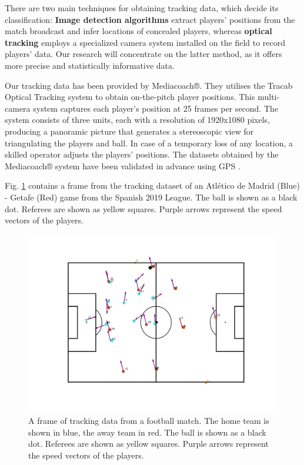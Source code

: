 \documentclass[
  twoside,nohyper]{book}
\begin{document}
There are two main techniques for obtaining tracking data, which decide its classification: \textbf{Image detection algorithms} extract players' positions from the match broadcast and infer locations of concealed players, whereas \textbf{optical tracking} employs a specialized camera system installed on the field to record players' data. Our research will concentrate on the latter method, as it offers more precise and statistically informative data.

Our tracking data has been provided by Mediacoach®. They utilises the Tracab Optical Tracking system to obtain on-the-pitch player positions. This multi-camera system captures each player's position at 25 frames per second. The system consists of three units, each with a resolution of 1920x1080 pixels, producing a panoramic picture that generates a stereoscopic view for triangulating the players and ball. In case of a temporary loss of any location, a skilled operator adjusts the players' positions. The datasets obtained by the Mediacoach® system have been validated in advance using GPS \citep{Felipe2019ValidationOA}.

Fig. \ref{fig:frame} contains a frame from the tracking dataset of an Atlético de Madrid (Blue) - Getafe (Red) game from the Spanish 2019 League. The ball is shown as a black dot. Referees are shown as yellow squares. Purple arrows represent the speed vectors of the players.

\begin{figure}[H]

{\centering \includegraphics[width=0.8\linewidth,]{imagenes/Frame} 

}

\caption{A frame of tracking data from a football match. The home team is shown in blue, the away team in red. The ball is shown as a black dot. Referees are shown as yellow squares. Purple arrows represent the speed vectors of the players.}\label{fig:frame}
\end{figure}
\end{document}
